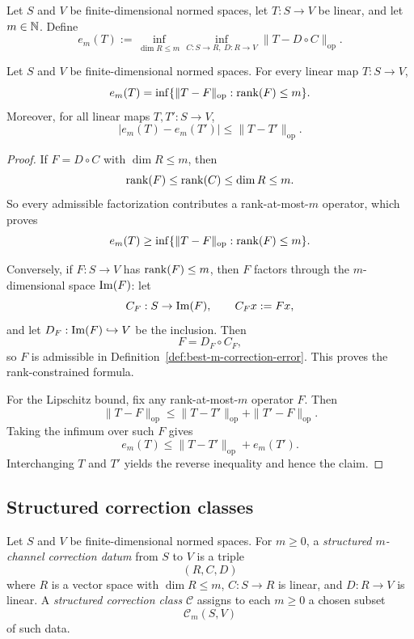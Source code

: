 \begin{definition}
\label{def:best-m-correction-error}
Let \(S\) and \(V\) be finite-dimensional normed spaces, let \(T:S\to V\) be
linear, and let \(m\in\mathbb{N}\). Define
\[
e_m(T):=
\inf_{\dim R\le m}
\inf_{C:S\to R,\ D:R\to V}
\|T-D\circ C\|_{\mathrm{op}}.
\]
\end{definition}

\begin{proposition}
\label{prop:best-m-correction-distance}
Let \(S\) and \(V\) be finite-dimensional normed spaces. For every linear map
\(T:S\to V\),
\[
e_m(T)
=
\inf\{\|T-F\|_{\mathrm{op}}:\mathrm{rank}(F)\le m\}.
\]
Moreover, for all linear maps \(T,T':S\to V\),
\[
|e_m(T)-e_m(T')|
\le
\|T-T'\|_{\mathrm{op}}.
\]
\end{proposition}

\begin{proof}
If \(F=D\circ C\) with \(\dim R\le m\), then
\[
\mathrm{rank}(F)\le \mathrm{rank}(C)\le \dim R\le m.
\]
So every admissible factorization contributes a rank-at-most-\(m\) operator,
which proves
\[
e_m(T)\ge \inf\{\|T-F\|_{\mathrm{op}}:\mathrm{rank}(F)\le m\}.
\]

Conversely, if \(F:S\to V\) has \(\mathrm{rank}(F)\le m\), then \(F\) factors through
the \(m\)-dimensional space \(\mathrm{Im}(F)\): let
\[
C_F:S\to \mathrm{Im}(F),\qquad C_Fx:=Fx,
\]
and let \(D_F:\mathrm{Im}(F)\hookrightarrow V\) be the inclusion. Then
\[
F=D_F\circ C_F,
\]
so \(F\) is admissible in Definition~\ref{def:best-m-correction-error}. This
proves the rank-constrained formula.

For the Lipschitz bound, fix any rank-at-most-\(m\) operator \(F\). Then
\[
\|T-F\|_{\mathrm{op}}
\le
\|T-T'\|_{\mathrm{op}}+\|T'-F\|_{\mathrm{op}}.
\]
Taking the infimum over such \(F\) gives
\[
e_m(T)\le \|T-T'\|_{\mathrm{op}}+e_m(T').
\]
Interchanging \(T\) and \(T'\) yields the reverse inequality and hence the
claim.
\end{proof}

\subsection{Structured correction classes}

\begin{definition}
\label{def:structured-correction-class}
Let \(S\) and \(V\) be finite-dimensional normed spaces. For \(m\ge 0\), a
\emph{structured \(m\)-channel correction datum} from \(S\) to \(V\) is a
triple
\[
(R,C,D)
\]
where \(R\) is a vector space with \(\dim R\le m\), \(C:S\to R\) is linear,
and \(D:R\to V\) is linear. A \emph{structured correction class}
\(\mathcal C\) assigns to each \(m\ge 0\) a chosen subset
\[
\mathcal C_m(S,V)
\]
of such data.
\end{definition}

